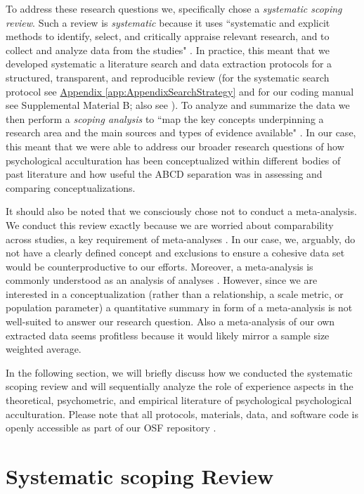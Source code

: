 \documentclass[man, 12pt, a4paper, mask]{apa7}
\newcommand{\appref}[2][]{\hyperref[#2]{Appendix \ref*{#2}#1}}
\begin{document}
To address these research questions we, specifically chose a \textit{systematic scoping review}. Such a review is \textit{systematic} because it uses ``systematic and explicit methods to identify, select, and critically appraise relevant research, and to collect and analyze data from the studies" \citep[PRISMA guidelines; ][p. 1]{Moher2009}. In practice, this meant that we developed systematic a literature search and data extraction protocols for a structured, transparent, and reproducible review (for the systematic search protocol see \appref{app:AppendixSearchStrategy} and for our coding manual see Supplemental Material B; also see \citealp{Peters2015}). To analyze and summarize the data we then perform a \textit{scoping analysis} to ``map the key concepts underpinning a research area and the main sources and types of evidence available" \citep[][p.21]{Arksey2005}. In our case, this meant that we were able to address our broader research questions of how psychological acculturation has been conceptualized within different bodies of past literature and how useful the ABCD separation was in assessing and comparing conceptualizations.

It should also be noted that we consciously chose not to conduct a meta-analysis. We conduct this review exactly because we are worried about comparability across studies, a key requirement of meta-analyses \citep{Pogue1998}. In our case, we, arguably, do not have a clearly defined concept and exclusions to ensure a cohesive data set would be counterproductive to our efforts. Moreover, a meta-analysis is commonly understood as an analysis of analyses \citep{Glass1976}. However, since we are interested in a conceptualization (rather than a relationship, a scale metric, or population parameter) a quantitative summary in form of a meta-analysis is not well-suited to answer our research question. Also a meta-analysis of our own extracted data seems profitless because it would likely mirror a sample size weighted average.

In the following section, we will briefly discuss how we conducted the systematic scoping review and will sequentially analyze the role of experience aspects in the theoretical, psychometric, and empirical literature of psychological psychological acculturation. Please note that all protocols, materials, data, and software code is openly accessible as part of our OSF repository \citep[][]{Kreienkamp2021e}.


\section{Systematic scoping Review}

\end{document}

